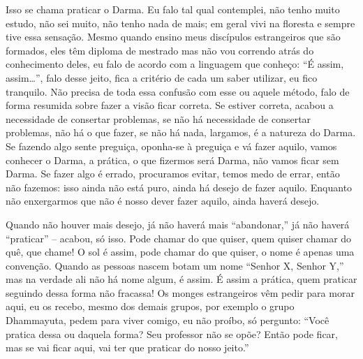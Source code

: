 Isso se chama praticar o Darma. Eu falo tal qual contemplei, não
tenho muito estudo, não sei muito, não tenho nada de mais; em geral
vivi na floresta e sempre tive essa sensação. Mesmo quando ensino meus
discípulos estrangeiros que são formados, eles têm diploma de mestrado
mas não vou correndo atrás do conhecimento deles, eu falo de acordo com
a linguagem que conheço: “É assim, assim\ldots{}”, falo desse jeito, fica a
critério de cada um saber utilizar, eu fico tranquilo. Não precisa de
toda essa confusão com esse ou aquele método, falo de forma resumida
sobre fazer a visão ficar correta. Se estiver correta, acabou a
necessidade de consertar problemas, se não há necessidade de consertar
problemas, não há o que fazer, se não há nada, largamos, é a natureza
do Darma. Se fazendo algo sente preguiça, oponha-se à preguiça e vá
fazer aquilo, vamos conhecer o Darma, a prática, o que fizermos será
Darma, não vamos ficar sem Darma. Se fazer algo é errado, procuramos
evitar, temos medo de errar, então não fazemos: isso ainda não está
puro, ainda há desejo de fazer aquilo. Enquanto não enxergarmos que não
é nosso dever fazer aquilo, ainda haverá desejo. 

Quando não houver mais desejo, já não haverá mais “abandonar,” já
não haverá “praticar” – acabou, só isso. Pode chamar do que quiser,
quem quiser chamar do quê, que chame! O sol é assim, pode chamar do que
quiser, o nome é apenas uma convenção. Quando as pessoas nascem botam
um nome “Senhor X, Senhor Y,” mas na verdade ali não há nome algum, é
assim. É assim a prática, quem praticar seguindo dessa forma não
fracassa! Os monges estrangeiros vêm pedir para morar aqui, eu os
recebo, mesmo dos demais grupos, por exemplo o grupo Dhammayuta, pedem
para viver comigo, eu não proíbo, só pergunto: “Você pratica dessa ou
daquela forma? Seu professor não se opõe? Então pode ficar, mas se vai
ficar aqui, vai ter que praticar do nosso jeito.”
